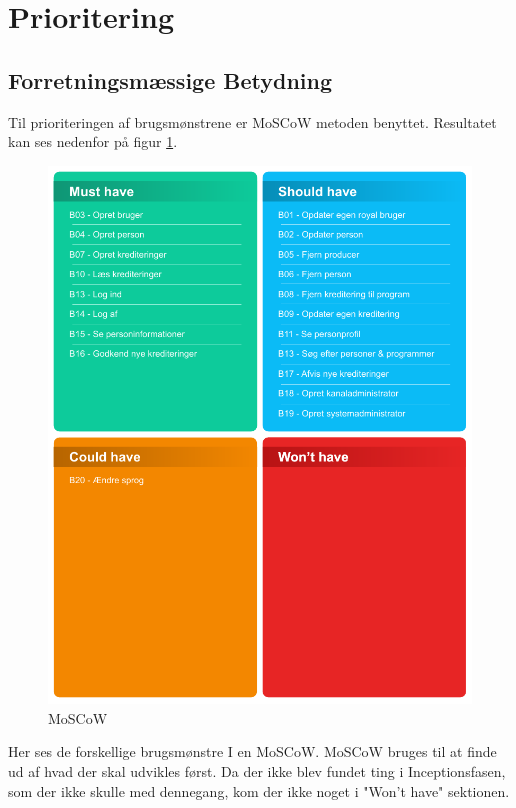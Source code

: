 \section{Prioritering}
\subsection{Forretningsmæssige Betydning}
Til prioriteringen af brugsmønstrene er MoSCoW metoden benyttet. Resultatet kan ses nedenfor på figur \ref{fig:moscow}.\\

\begin{figure}[h]
\centering
\includegraphics[scale=1]{figures/MoSCoW.pdf}
\caption{MoSCoW}
\label{fig:moscow}
\end{figure}

\noindent
Her ses de forskellige brugsmønstre I en MoSCoW. MoSCoW bruges til at finde ud af hvad der skal udvikles først. 
Da der ikke blev fundet ting i Inceptionsfasen, som der ikke skulle med dennegang, kom der ikke noget i "Won't have" sektionen.


